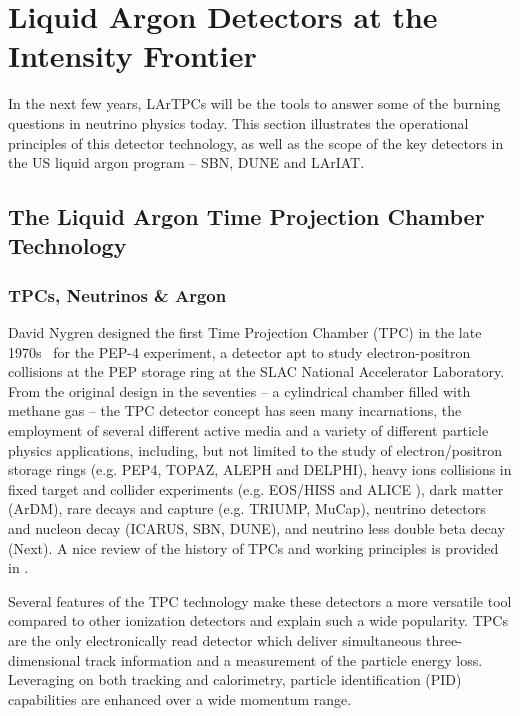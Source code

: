 \chapter{Liquid Argon Detectors at the Intensity Frontier}\label{ch:2}
In the next few years, LArTPCs will  be the tools to answer some of the burning questions in neutrino physics today.  This section illustrates the operational principles of this detector technology, as well as the scope of the key detectors in the US liquid argon program -- SBN, DUNE and LArIAT.


\section{The Liquid Argon Time Projection Chamber Technology}

\subsection{TPCs, Neutrinos \& Argon}
David Nygren designed the first Time Projection Chamber (TPC) in the late 1970s~\cite{FirstTPC} for the  PEP-4 experiment, a detector  apt to study electron-positron collisions at the PEP storage ring at the SLAC National Accelerator Laboratory.
From the original design  in the seventies -- a cylindrical chamber filled with methane gas -- the TPC detector concept has seen many incarnations, the employment of several different active media and a variety of different particle physics applications, including, but not limited to the study of electron/positron storage rings (e.g. PEP4, TOPAZ, ALEPH and DELPHI), heavy ions collisions in fixed target and collider experiments (e.g. EOS/HISS and ALICE ), dark matter (ArDM), rare decays and capture (e.g. TRIUMP, MuCap),  neutrino detectors and nucleon decay (ICARUS, SBN, DUNE), and neutrino less double beta decay (Next). A nice review of the history of TPCs and working principles is provided in \cite{0034-4885-73-11-116201}.

Several features of the TPC technology make these detectors a more versatile tool compared to other ionization detectors and explain such a wide popularity. TPCs are the only electronically read detector which deliver simultaneous  three-dimensional track information and a measurement of the particle energy loss. Leveraging on both tracking and calorimetry,  particle identification (PID) capabilities are enhanced  over a wide momentum range. 

